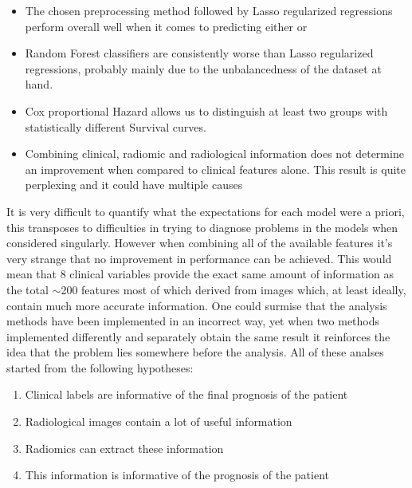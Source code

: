 \begin{itemize}
\item The chosen preprocessing method followed by Lasso regularized regressions perform overall well when it comes to predicting either \death or \icu
\item Random Forest classifiers are consistently worse than Lasso regularized regressions, probably mainly due to the unbalancedness of the dataset at hand.
\item Cox proportional Hazard allows us to distinguish at least two groups with statistically different Survival curves.
\item Combining clinical, radiomic and radiological information does not determine an improvement when compared to clinical features alone.
This result is quite perplexing and it could have multiple causes
\end{itemize}

It is very difficult to quantify what the expectations for each model were a priori, this transposes to difficulties in trying to diagnose problems in the models when considered singularly. However when combining all of the available features it's very strange that no improvement in performance can be achieved. This would mean that 8 clinical variables provide the exact same amount of information as the total $\sim$200 features most of which derived from images which, at least ideally, contain much more accurate information. 
One could surmise that the analysis methods have been implemented in an incorrect way, yet when two methods implemented differently and separately obtain the same result it reinforces the idea that the problem lies somewhere before the analysis.
 All of these analses started from the following hypotheses:

\begin{enumerate}
\item Clinical labels are informative of the final prognosis of the patient
\item Radiological images contain a lot of useful information
\item Radiomics can extract these information
\item This information is informative of the prognosis of the patient
\end{enumerate}

